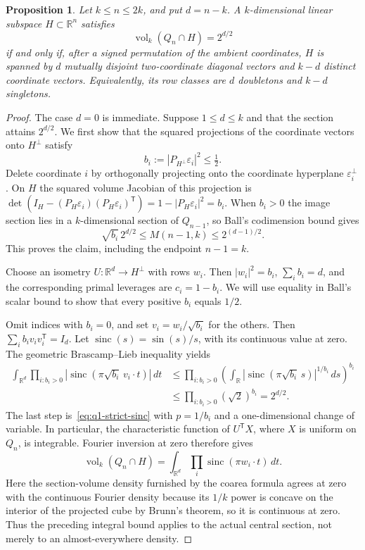 \documentclass[11pt,a4paper]{article}
\newtheorem{proposition}[theorem]{Proposition}
\theoremstyle{remark}\newtheorem{remark}[theorem]{Remark}
\numberwithin{equation}{section}
\begin{document}
\begin{proposition}\label{prop:q1-equality}
Let $k\le n\le2k$, and put $d=n-k$.  A $k$-dimensional linear subspace
$H\subset\mathbb R^n$ satisfies
\[
 \operatorname{vol}_k(Q_n\cap H)=2^{d/2}
\]
if and only if, after a signed permutation of the ambient coordinates,
$H$ is spanned by $d$ mutually disjoint two-coordinate diagonal vectors
and $k-d$ distinct coordinate vectors.  Equivalently, its row classes
are $d$ doubletons and $k-d$ singletons.
\end{proposition}
\begin{proof}
The case \(d=0\) is immediate. Suppose \(1\le d\le k\) and that the
section attains \(2^{d/2}\). We first show that the squared projections
of the coordinate vectors onto \(H^\perp\) satisfy
\[
 b_i:=|P_{H^\perp}\varepsilon_i|^2\le\tfrac12 .
\]
Delete coordinate \(i\) by orthogonally projecting onto the coordinate
hyperplane \(\varepsilon_i^\perp\). On \(H\) the squared volume
Jacobian of this projection is
\(\det(I_H-(P_H\varepsilon_i)(P_H\varepsilon_i)^{\mathsf T})
=1-|P_H\varepsilon_i|^2=b_i\). When \(b_i>0\) the image section
lies in a \(k\)-dimensional section of \(Q_{n-1}\), so Ball's
codimension bound gives
\[
 \sqrt{b_i}\,2^{d/2}\le M(n-1,k)\le 2^{(d-1)/2}.
\]
This proves the claim, including the endpoint \(n-1=k\).

Choose an isometry \(U:\mathbb R^d\to H^\perp\) with rows \(w_i\).
Then \(|w_i|^2=b_i\), \(\sum_i b_i=d\), and the corresponding primal
leverages are \(c_i=1-b_i\). We will use equality in Ball's scalar
bound to show that every positive \(b_i\) equals \(1/2\).

Omit indices with $b_i=0$, and set $v_i=w_i/\sqrt{b_i}$ for the others.
Then $\sum_i b_i v_i v_i^{\mathsf T}=I_d$.  Let
$\operatorname{sinc}(s)=\sin(s)/s$, with its continuous value at zero.
The geometric Brascamp--Lieb inequality yields
\begin{align*}
 \int_{\mathbb R^d}\prod_{i:b_i>0}
       |\operatorname{sinc}(\pi\sqrt{b_i}\,v_i\cdot t)|\,dt
 &\le\prod_{i:b_i>0}
 \left(\int_{\mathbb R}
       |\operatorname{sinc}(\pi\sqrt{b_i}\,s)|^{1/b_i}\,ds
       \right)^{b_i}\\
 &\le\prod_{i:b_i>0}(\sqrt2)^{b_i}=2^{d/2}.
\end{align*}
The last step is~\eqref{eq:q1-strict-sinc} with $p=1/b_i$ and a
one-dimensional change of variable.  In particular, the characteristic
function of $U^{\mathsf T}X$, where $X$ is uniform on $Q_n$, is integrable.
Fourier inversion at zero therefore gives
\[
 \operatorname{vol}_k(Q_n\cap H)
 =\int_{\mathbb R^d}\prod_i
       \operatorname{sinc}(\pi w_i\cdot t)\,dt.
\]
Here the section-volume density furnished by the coarea formula agrees
at zero with the continuous Fourier density because its $1/k$ power is concave
on the interior of the projected cube by Brunn's theorem, so it is
continuous at zero.  Thus the preceding integral bound applies to the
actual central section, not merely to an almost-everywhere density.


\end{proof}
\end{document}
